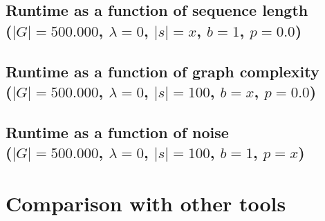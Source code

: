 \documentclass[thesis.tex]{subfiles}
\begin{document}
\subsection*{Runtime as a function of sequence length\\
($|G|=500.000$, $\lambda=0$, $|s|=x$, $b=1$, $p=0.0$)}
\subsection*{Runtime as a function of graph complexity\\
($|G|=500.000$, $\lambda=0$, $|s|=100$, $b=x$, $p=0.0$)}
\subsection*{Runtime as a function of noise\\
($|G|=500.000$, $\lambda=0$, $|s|=100$, $b=1$, $p=x$)}
\section{Comparison with other tools}
\label{sec:comparison_tools}
\end{document}
